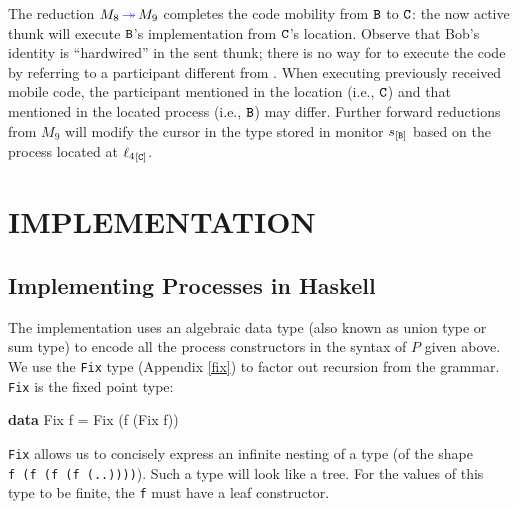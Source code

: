 \documentclass[runningheads,plain]{llncs}
\newcommand{\erase}[1]{\textcolor{orange}{#1}}
\newenvironment{Shaded}{}{}
\newcommand{\KeywordTok}[1]{\textcolor[rgb]{0.00,0.44,0.13}{\textbf{#1}}}
\newcommand{\DataTypeTok}[1]{\textcolor[rgb]{0.56,0.13,0.00}{#1}}
\newcommand{\FunctionTok}[1]{\textcolor[rgb]{0.02,0.16,0.49}{#1}}
\newcommand{\NormalTok}[1]{#1}
\begin{document}
The reduction $M_8 \textcolor{blue}{\,\twoheadrightarrow\,} M_9$ completes the code mobility from $\mathtt{B}$ to $\mathtt{C}$: the now active thunk
will execute $\mathtt{B}$'s implementation from $\mathtt{C}$'s location. Observe that Bob's identity \pB is ``hardwired'' in the sent thunk; 
there is no way for \pC to execute the code by referring to a participant different  from \pB.
When executing previously received mobile code, the participant mentioned in the location (i.e., $\mathtt{C}$)
and that mentioned in the located process (i.e., $\mathtt{B}$) may differ.
Further forward reductions from $M_9$ will  modify the cursor in the type stored in monitor $s_{[\mathtt{B}]}$
based on the process located at ${{\ell_4}}_{[\mathtt{C}]}$.



\section{IMPLEMENTATION}

\subsection{Implementing Processes in Haskell}\label{implementing-the-ppdp17-calculus-in-haskell}

The implementation uses an algebraic data type (also known as union type or sum type) to
encode all the process constructors in the syntax of $P$ given above. We use the \texttt{Fix} type
(Appendix \ref{fix}) to factor out recursion from the grammar.
\texttt{Fix} is the fixed point type:

\begin{Shaded}
\begin{Highlighting}[]
\KeywordTok{data} \DataTypeTok{Fix}\NormalTok{ f }\FunctionTok{=} \DataTypeTok{Fix}\NormalTok{ (f (}\DataTypeTok{Fix}\NormalTok{ f))}
\end{Highlighting}
\end{Shaded}

\texttt{Fix} allows us to concisely express an infinite nesting of a
type (of the shape \texttt{f\ (f\ (f\ (f\ (..))))}). Such a type will
look like a tree. For the values of this type to be finite, the
\texttt{f} must have a leaf constructor. 
\end{document}
